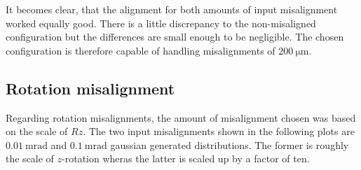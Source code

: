 It becomes clear, that the alignment for both amounts of input misalignment worked equally good. There is a little discrepancy to the non-misaligned configuration but the differences are small enough to be negligible.
The chosen configuration is therefore capable of handling misalignments of $\SI{200}{\micro\metre}$.

\subsection{Rotation misalignment}
\label{sec:misR}

Regarding rotation misalignments, the amount of misalignment chosen was based on the scale of $Rz$.
The two input misalignments shown in the following plots are $\SI{0.01}{\milli\radian}$ and $\SI{0.1}{\milli\radian}$ gaussian generated distributions. The former is roughly the scale of $z$-rotation wheras the latter is scaled up by a factor of ten.


